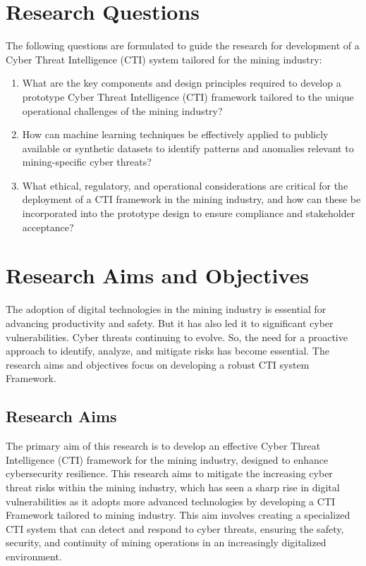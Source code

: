 \documentclass[a4paper,twoside,12pt]{report}
\begin{document}

\section{Research Questions}

The following questions are formulated to guide the research for development of a Cyber Threat Intelligence (CTI) system tailored for the mining industry:

\begin{enumerate}
    \item {What are the key components and design principles required to develop a prototype Cyber Threat Intelligence (CTI) framework tailored to the unique operational challenges of the mining industry?}
    \item {How can machine learning techniques be effectively applied to publicly available or synthetic datasets to identify patterns and anomalies relevant to mining-specific cyber threats?}
    \item {What ethical, regulatory, and operational considerations are critical for the deployment of a CTI framework in the mining industry, and how can these be incorporated into the prototype design to ensure compliance and stakeholder acceptance?}
\end{enumerate}

\section{Research Aims and Objectives}
The adoption of digital technologies in the mining industry is essential for advancing productivity and safety. But it has also led it to significant cyber vulnerabilities. Cyber threats continuing to evolve. So, the need for a proactive approach to identify, analyze, and mitigate risks has become essential. The research aims and objectives focus on developing a robust CTI system Framework.\\
\subsection{Research Aims}
The primary aim of this research is to develop an effective Cyber Threat Intelligence (CTI) framework for the mining industry, designed to enhance cybersecurity resilience. This research aims to mitigate the increasing cyber threat risks within the mining industry, which has seen a sharp rise in digital vulnerabilities as it adopts more advanced technologies by developing a CTI Framework tailored to mining industry. This aim involves creating a specialized CTI system that can detect and respond to cyber threats, ensuring the safety, security, and continuity of mining operations in an increasingly digitalized environment.
\end{document}
